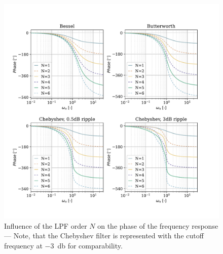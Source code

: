 \begin{figure}[!htb]
  \centering
  \includegraphics[scale=0.72]{figures/electronics/lowpass/lp_filter_pha}
  \caption[Influence of the \ac{LPF} order $N$ on the  phase of the frequency response]{Influence of the \ac{LPF} order $N$ on the  phase of the frequency response --- Note, that the Chebyshev filter is represented with the cutoff frequency at \SI{-3}{\decibel} for comparability.%
    \label{fig:lp_filter_pha}}
\end{figure}

